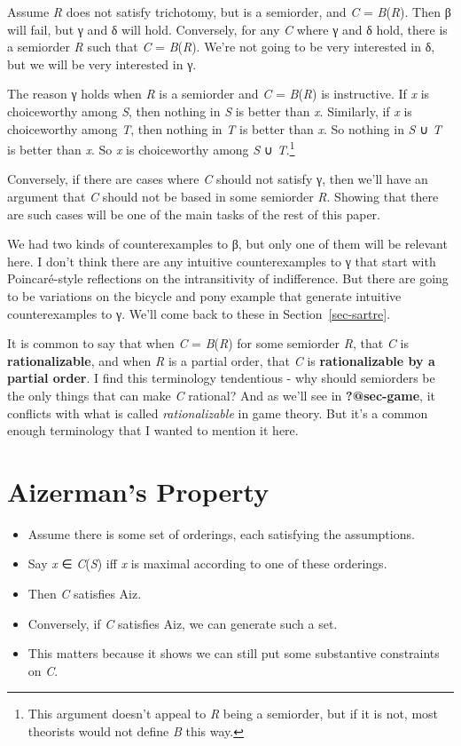 \documentclass[
  11pt,
  letterpaper,
  DIV=11,
  numbers=noendperiod,
  twoside]{scrartcl}
\providecommand{\tightlist}{%
  \setlength{\itemsep}{0pt}\setlength{\parskip}{0pt}}
\begin{document}
Assume \emph{R} does not satisfy trichotomy, but is a semiorder, and
\emph{C} = \emph{B}(\emph{R}). Then β will fail, but γ and δ will hold.
Conversely, for any \emph{C} where γ and δ hold, there is a semiorder
\emph{R} such that \emph{C} = \emph{B}(\emph{R}). We're not going to be
very interested in δ, but we will be very interested in γ.

The reason γ holds when \emph{R} is a semiorder and \emph{C} =
\emph{B}(\emph{R}) is instructive. If \emph{x} is choiceworthy among
\emph{S}, then nothing in \emph{S} is better than \emph{x}. Similarly,
if \emph{x} is choiceworthy among \emph{T}, then nothing in \emph{T} is
better than \emph{x}. So nothing in \emph{S} ∪ \emph{T} is better than
\emph{x}. So \emph{x} is choiceworthy among \emph{S} ∪
\emph{T}.\footnote{This argument doesn't appeal to \emph{R} being a
  semiorder, but if it is not, most theorists would not define \emph{B}
  this way.}

Conversely, if there are cases where \emph{C} should not satisfy γ, then
we'll have an argument that \emph{C} should not be based in some
semiorder \emph{R}. Showing that there are such cases will be one of the
main tasks of the rest of this paper.

We had two kinds of counterexamples to β, but only one of them will be
relevant here. I don't think there are any intuitive counterexamples to
γ that start with Poincaré-style reflections on the intransitivity of
indifference. But there are going to be variations on the bicycle and
pony example that generate intuitive counterexamples to γ. We'll come
back to these in Section~\ref{sec-sartre}.

It is common to say that when \emph{C} = \emph{B}(\emph{R}) for some
semiorder \emph{R}, that \emph{C} is \textbf{rationalizable}, and when
\emph{R} is a partial order, that \emph{C} is \textbf{rationalizable by
a partial order}. I find this terminology tendentious - why should
semiorders be the only things that can make \emph{C} rational? And as
we'll see in \textbf{?@sec-game}, it conflicts with what is called
\emph{rationalizable} in game theory. But it's a common enough
terminology that I wanted to mention it here.

\section{Aizerman's Property}\label{sec-aiz}

\begin{itemize}
\tightlist
\item
  Assume there is some set of orderings, each satisfying the
  assumptions.
\item
  Say \emph{x} ∈ \emph{C}(\emph{S}) iff \emph{x} is maximal according to
  one of these orderings.
\item
  Then \emph{C} satisfies Aiz.
\item
  Conversely, if \emph{C} satisfies Aiz, we can generate such a set.
\item
  This matters because it shows we can still put some substantive
  constraints on \emph{C}.
\end{itemize}
\end{document}

